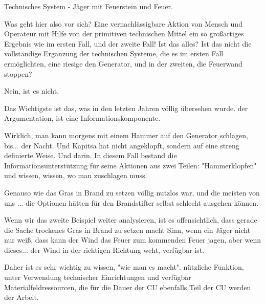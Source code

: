 \documentclass[11pt,a4paper]{article}
\begin{document}
{Technisches System - Jäger mit Feuerstein und Feuer.

Was geht hier also vor sich? Eine vernachlässigbare Aktion von Mensch und Operateur mit Hilfe von
der primitiven technischen Mittel ein so großartiges Ergebnis wie im ersten Fall,
und der zweite Fall! Ist das alles? Ist das nicht die vollständige Ergänzung der technischen
Systeme, die es im ersten Fall ermöglichten, eine riesige
den Generator, und in der zweiten, die Feuerwand stoppen?

Nein, ist es nicht.

Das Wichtigste ist das, was in den letzten Jahren völlig übersehen wurde.
der Argumentation, ist eine Informationskomponente.

Wirklich, man kann morgens mit einem Hammer auf den Generator schlagen, bis...
der Nacht. Und Kapitsa hat nicht angeklopft, sondern auf eine streng definierte Weise. Und darin.
In diesem Fall bestand die Informationsunterstützung für seine Aktionen aus zwei Teilen:
"Hammerklopfen" und wissen, wissen, wo man zuschlagen muss.

Genauso wie das Gras in Brand zu setzen völlig nutzlos war, und die meisten von uns
... die Optionen hätten für den Brandstifter selbst schlecht ausgehen können.

Wenn wir das zweite Beispiel weiter analysieren, ist es offensichtlich, dass gerade die Sache
trockenes Gras in Brand zu setzen macht Sinn, wenn ein Jäger nicht nur weiß, dass
kann der Wind das Feuer zum kommenden Feuer jagen, aber wenn dieses...
der Wind in der richtigen Richtung weht, verfügbar ist.

Daher ist es sehr wichtig zu wissen, "wie man es macht".
nützliche Funktion, unter Verwendung technischer Einrichtungen und verfügbar
Materialfeldressourcen, die für die Dauer der CU ebenfalls Teil der CU werden
der Arbeit.

}
\end{document}
